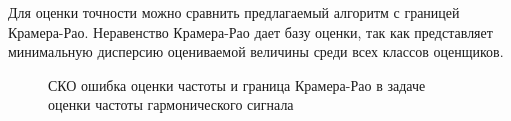 Для оценки точности можно сравнить предлагаемый алгоритм с границей Крамера-Рао. Неравенство Крамера-Рао дает базу оценки, так
как представляет минимальную дисперсию оцениваемой величины среди всех классов оценщиков.
\begin{figure}[H]
\center{}
	\caption{СКО ошибка оценки частоты и граница Крамера-Рао в задаче оценки частоты гармонического сигнала}
	\label{pic:crlb_vs_1sat_algo}
\end{figure}
